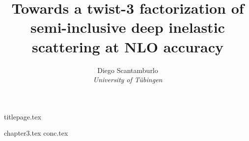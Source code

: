 \documentclass[12pt,oneside,openany]{report}
\title{Towards a twist-3 factorization of semi-inclusive deep inelastic scattering at NLO accuracy}
\author{Diego Scantamburlo\\\textit{University of Tübingen}}
\begin{document}
{titlepage.tex}


{chapter3.tex}
{conc.tex}
\end{document}
